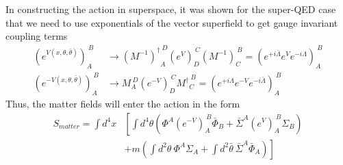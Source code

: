 \documentclass[a4paper,12pt]{article}
\numberwithin{equation}{section}
\numberwithin{exe}{section}
\renewcommand{\L}{{\Lambda}}
\newcommand{\Lb}{{\bar\Lambda}}
\renewcommand{\S}{{\Sigma}}
\newcommand{\Sb}{{\bar\Sigma}}
\renewcommand{\t}{{\theta}}
\newcommand{\tb}{{\bar\theta}}
\newcommand{\Phib}{{\bar \Phi}}
\begin{document}
In constructing the action in superspace, it was shown for the super-QED case that we need to use exponentials of the vector superfield to get gauge invariant coupling terms
	\begin{equation}
		\begin{aligned}
		(e^{V(x,\t,\tb)})_A^{\ B} & \rightarrow {(M^{-1})^\dagger}_A^{\ D}(e^V)_D^{\ C}(M^{-1})_C^{\ B}= (e^{+i\Lb} e^V e^{-i\L})_A^{\ B} \\
		(e^{-V(x,\t,\tb)})_A^{\ B} & \rightarrow M_A^{\ D}(e^{-V})_D^{\ C}{M^\dagger}_C^{\ B}= (e^{+i\L} e^{-V} e^{-i\Lb})_A^{\ B}
		\end{aligned}
	\end{equation}
Thus, the matter fields will enter the action in the form
	\begin{align}
	S_{matter} = \int d^4 x & \left[  \int d^4\t \left( \Phi^A(e^{-V})_A^{\ B}\Phib_B + \Sb^A(e^V)_A^{\ B}\S_B \right) \right. \nonumber \\
	& \left. + m \left(\int d^2\t\ \Phi^A\S_A + \int d^2\tb\ \Sb^A \Phib_A\right)\right]
	\end{align}
\end{document}

